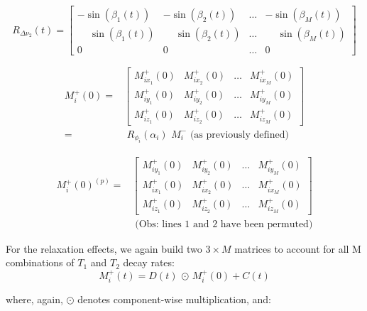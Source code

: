 \begin{equation}
    R_{\Delta \nu_2}(t)  = \begin{bmatrix} -\sin(\beta_{1}(t) ) & -\sin(\beta_{2}(t) ) & \dots & -\sin(\beta_{M}(t) ) \\
    \phantom{-}\sin(\beta_{1}(t) ) & \phantom{-}\sin(\beta_{2}(t) ) & \dots & \phantom{-}\sin(\beta_{M}(t) ) \\
    0     &      0      & \dots &      0
    \end{bmatrix}
\end{equation}

\begin{equation}
\begin{split}
    M^{+}_i(0) = &
    \begin{bmatrix}
        M^{+}_{ix_1}(0) & M^{+}_{ix_2}(0) & \dots & M^{+}_{ix_M}(0) \\
        M^{+}_{iy_1}(0) & M^{+}_{iy_2}(0) & \dots & M^{+}_{iy_M}(0) \\
        M^{+}_{iz_1}(0) & M^{+}_{iz_2}(0) & \dots & M^{+}_{iz_M}(0)
    \end{bmatrix} \\
    = & \, \, R_{\phi_i}(\alpha_i) \, \, M^{-}_i \text{ (as previously defined)}
\end{split}
\end{equation}

\begin{equation}
\begin{split}
    M^{+}_i(0)^{(p)} = &
    \begin{bmatrix}
        M^{+}_{iy_1}(0) & M^{+}_{iy_2}(0) & \dots & M^{+}_{iy_M}(0) \\
        M^{+}_{ix_1}(0) & M^{+}_{ix_2}(0) & \dots & M^{+}_{ix_M}(0) \\
        M^{+}_{iz_1}(0) & M^{+}_{iz_2}(0) & \dots & M^{+}_{iz_M}(0)
    \end{bmatrix} \\
    & \text{ (Obs: lines 1 and 2 have been permuted)}
\end{split}
\end{equation}

For the relaxation effects, we again build two $3 \times M$ matrices to account for all M combinations of $T_1$ and $T_2$ decay rates:
\begin{equation}
    M^{+}_i(t) = D(t)  \, \odot \, M^{+}_i(0) + C(t) 
\end{equation}

where, again, $\odot$ denotes component-wise multiplication, and:

